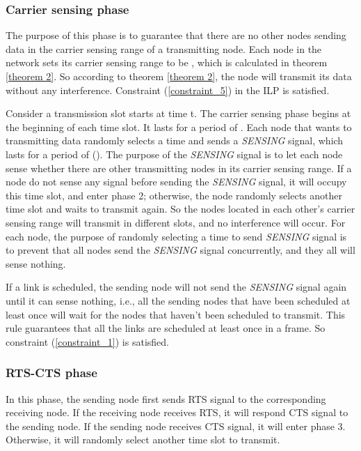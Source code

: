 \documentclass[conference]{IEEEtran}
\begin{document}
\subsubsection{Carrier sensing phase}
The purpose of this phase is to guarantee that there are no other
nodes sending data in the carrier sensing range of a transmitting
node. Each node in the network sets its carrier sensing range to be
, which is calculated in theorem \ref{theorem 2}. So according
to theorem \ref{theorem 2}, the node will transmit its data without
any interference. Constraint (\ref{constraint_5}) in the ILP is
satisfied.

Consider a transmission slot starts at time t. The carrier sensing
phase begins at the beginning of each time slot. It lasts for a
period of . Each node that wants to transmitting data randomly
selects a time  and sends a \emph{SENSING} signal, which lasts
for a period of  (). The purpose of
the \emph{SENSING} signal is to let each node sense whether there
are other transmitting nodes in its carrier sensing range. If a node
do not sense any signal before sending the \emph{SENSING} signal, it
will occupy this time slot, and enter phase 2; otherwise, the node
randomly selects another time slot and waits to transmit again. So
the nodes located in each other's carrier sensing range will
transmit in different slots, and no interference will occur. For
each node, the purpose of randomly selecting a time to send
\emph{SENSING} signal is to prevent that all nodes send the
\emph{SENSING} signal concurrently, and they all will sense nothing.

If a link is scheduled, the sending node will not send the
\emph{SENSING} signal again until it can sense nothing, i.e., all
the sending nodes that have been scheduled at least once will wait
for the nodes that haven't been scheduled to transmit. This rule
guarantees that all the links are scheduled at least once in a
frame. So constraint (\ref{constraint_1}) is satisfied.
\subsubsection{RTS-CTS phase}
In this phase, the sending node  first sends RTS signal to the
corresponding receiving node. If the receiving node receives RTS, it
will respond CTS signal to the sending node. If the sending node
receives CTS signal, it will enter phase 3. Otherwise, it will
randomly select another time slot to transmit.
\end{document}
